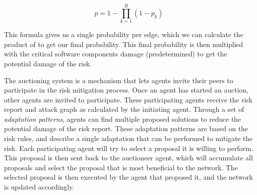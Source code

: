 \[p = 1 - \prod_{k=1}^{R}(1-p_{k}) \]

This formula gives us a single probability per edge, which we can calculate the product of to get our final probability. This final probability is then multiplied with the critical software components damage (predetermined) to get the potential damage of the risk.

\vspace{0.5em}
The auctioning system is a mechanism that lets agents invite their peers to participate in the risk mitigation process. Once an agent has started an auction, other agents are invited to participate. These participating agents receive the risk report and attack graph as calculated by the initiating agent. Through a set of \emph{adaptation patterns}, agents can find multiple proposed solutions to reduce the potential damage of the risk report. These adaptation patterns are based on the risk rules, and describe a single adaptation that can be performed to mitigate the risk.
Each participating agent will try to select a proposal it is willing to perform. This proposal is then sent back to the auctioneer agent, which will accumulate all proposals and select the proposal that is most beneficial to the network. The selected proposal is then executed by the agent that proposed it, and the network is updated accordingly.
